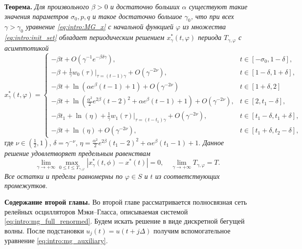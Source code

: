 \textbf{Теорема.} \textit{Для произвольного $\beta > 0$ и достаточно больших $\alpha$ существуют такие значения параметров $\sigma_0, p, q$ и такое достаточно большое $\gamma_0$, что при всех $\gamma > \gamma_0$ уравнение \eqref{eq:intro:MG_x} с начальной функцией $\varphi$ из множества \eqref{eq:intro:init_set} обладает периодическим решением $x^*_\gamma(t, \varphi)$ периода $T_{\gamma, \varphi}$ с асимптотикой}
\footnotesize
\begin{equation}
	\label{eq:intro:sol_x*gamma}
	x^*_\gamma(t, \varphi)= 
	\begin{cases}
		- \beta t + O(\gamma^{-1} e^{-\beta \delta \gamma}), & t\in[-\sigma_0, 1 - \delta],\\
		-\beta + \frac{1}{\gamma} w_0(\tau)|_{\tau=(t - 1)\gamma} + O(\gamma^{-2\nu}), & t \in [1 - \delta,1 + \delta],\\
		- \beta t + \ln(\alpha e^{\beta}(t - 1) + 1) + O(\gamma^{-2\nu}) & t\in[1 + \delta, 2]\\
		- \beta t + \ln(\frac{\alpha^2}{2}e^{2 \beta}(t - 2)^2 + \alpha e^{\beta}(t - 1) + 1) + O(\gamma^{-2\nu}), & t \in [2, t_1 - \delta],\\
		- \beta t_1 + \ln(\eta)+\frac{1}{\gamma} w_1(\tau)|_{\tau=(t - t_1)\gamma} + O(\gamma^{-2\nu}), & t\in[t_1 - \delta, t_1  +\delta],\\
		- \beta t + \ln(\eta) + O(\gamma^{-2\nu}), & t \in [t_1 + \delta, t_2 - \delta],
	\end{cases}
\end{equation}
\normalsize
где $\nu \in (\frac{1}{2}, 1)$, $\delta = \gamma^{-\nu}$, $\eta=\frac{\alpha^2}{2}e^{2\beta}(t_1 - 2)^2 + \alpha e^{\beta}(t_1 - 1) + 1$.
%
\textit{Данное решение удовлетворяет предельным равенствам}
%
\begin{equation}
	\label{eq:intro:lim_x*}
	\lim_{\gamma\to+\infty}\max_{0\leqslant t\leqslant T_{\gamma, \varphi}}|x_{\gamma}^*(t, \phi)-x^*(t)|=0,\quad \lim_{\gamma\to+\infty}T_{\gamma, \varphi} = T.
\end{equation}
\textit{Все остатки и пределы равномерны по $\varphi \in S$ и $t$ из соответствующих промежутков.}

\textbf{Содержание второй главы.} Во второй главе рассматривается полносвязная сеть релейных осцилляторов Мэки--Гласса, описываемая системой \eqref{eq:intro:mg_full_renormed}. Будем искать решение в виде дискретной бегущей волны. После подстановки $u_j(t) = u(t + j\Delta)$ получим вспомогательное уравнение \eqref{eq:intro:mg_auxiliary}.

